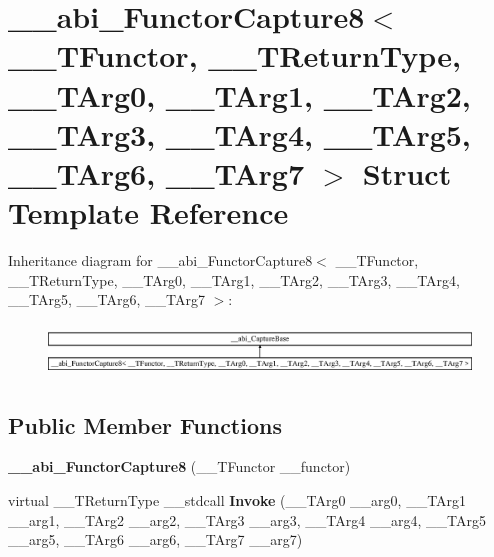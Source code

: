 \hypertarget{struct____abi___functor_capture8}{}\section{\+\_\+\+\_\+abi\+\_\+\+Functor\+Capture8$<$ \+\_\+\+\_\+\+T\+Functor, \+\_\+\+\_\+\+T\+Return\+Type, \+\_\+\+\_\+\+T\+Arg0, \+\_\+\+\_\+\+T\+Arg1, \+\_\+\+\_\+\+T\+Arg2, \+\_\+\+\_\+\+T\+Arg3, \+\_\+\+\_\+\+T\+Arg4, \+\_\+\+\_\+\+T\+Arg5, \+\_\+\+\_\+\+T\+Arg6, \+\_\+\+\_\+\+T\+Arg7 $>$ Struct Template Reference}
\label{struct____abi___functor_capture8}
Inheritance diagram for \+\_\+\+\_\+abi\+\_\+\+Functor\+Capture8$<$ \+\_\+\+\_\+\+T\+Functor, \+\_\+\+\_\+\+T\+Return\+Type, \+\_\+\+\_\+\+T\+Arg0, \+\_\+\+\_\+\+T\+Arg1, \+\_\+\+\_\+\+T\+Arg2, \+\_\+\+\_\+\+T\+Arg3, \+\_\+\+\_\+\+T\+Arg4, \+\_\+\+\_\+\+T\+Arg5, \+\_\+\+\_\+\+T\+Arg6, \+\_\+\+\_\+\+T\+Arg7 $>$\+:\begin{figure}[H]
\begin{center}
\leavevmode
\includegraphics[height=1.396509cm]{df/d53/struct____abi___functor_capture8}
\end{center}
\end{figure}
\subsection*{Public Member Functions}
\begin{DoxyCompactItemize}
\item 
\mbox{\label{struct____abi___functor_capture8_aef7a314992e5ab7822493d820d77f962}} 
{\bfseries \+\_\+\+\_\+abi\+\_\+\+Functor\+Capture8} (\+\_\+\+\_\+\+T\+Functor \+\_\+\+\_\+functor)
\item 
\mbox{\label{struct____abi___functor_capture8_ac6c877c27e23568e4d2d5628aa82350d}} 
virtual \+\_\+\+\_\+\+T\+Return\+Type \+\_\+\+\_\+stdcall {\bfseries Invoke} (\+\_\+\+\_\+\+T\+Arg0 \+\_\+\+\_\+arg0, \+\_\+\+\_\+\+T\+Arg1 \+\_\+\+\_\+arg1, \+\_\+\+\_\+\+T\+Arg2 \+\_\+\+\_\+arg2, \+\_\+\+\_\+\+T\+Arg3 \+\_\+\+\_\+arg3, \+\_\+\+\_\+\+T\+Arg4 \+\_\+\+\_\+arg4, \+\_\+\+\_\+\+T\+Arg5 \+\_\+\+\_\+arg5, \+\_\+\+\_\+\+T\+Arg6 \+\_\+\+\_\+arg6, \+\_\+\+\_\+\+T\+Arg7 \+\_\+\+\_\+arg7)
\end{DoxyCompactItemize}
